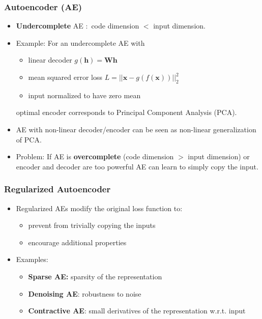 \documentclass[11pt,mathserif]{beamer}
\renewcommand{\vec}[1]{{\boldsymbol{ #1}}}
\begin{document}
 \begin{frame}
  \frametitle{Autoencoder (AE)}
  
  \begin{itemize}
  \item \textbf{Undercomplete} AE $:$ code dimension $<$ input dimension.
  \item  Example: For an undercomplete AE with 
  \begin{itemize}
  \item  linear decoder $g(\vec h)= \vec W \vec h$
  \item  mean squared error loss $L=||\vec x-g(f(\vec x))||^2_2$
  \item  input normalized to have zero mean
  \end{itemize}
  optimal encoder corresponds to Principal Component Analysis (PCA).
  \item AE with non-linear decoder/encoder can be seen as non-linear generalization of PCA.
  \item Problem: If AE is \textbf{overcomplete} (code dimension $>$ input dimension) or encoder and decoder are too powerful AE can learn to simply copy the input.
    
  \end{itemize}
  
 \end{frame}
  
  \begin{frame}
  \frametitle{Regularized Autoencoder}
    \begin{itemize}
      
       \item Regularized AEs modify the original loss function to:
       \begin{itemize}
       \item prevent from trivially copying the inputs 
       \item encourage additional properties
       \end{itemize}
       
     
        \item Examples:
            \begin{itemize}
                \item \textbf{Sparse AE:} sparsity of the representation
                \item \textbf{Denoising AE}: robustness to noise %
                \item \textbf{Contractive AE}: small derivatives of the representation w.r.t. input
            \end{itemize}
   
    \end{itemize} 
  
  
\end{frame}
\end{document}
